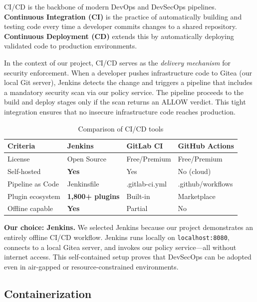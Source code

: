 CI/CD is the backbone of modern DevOps and DevSecOps pipelines. \textbf{Continuous Integration (CI)} is the practice of automatically building and testing code every time a developer commits changes to a shared repository. \textbf{Continuous Deployment (CD)} extends this by automatically deploying validated code to production environments.

In the context of our project, CI/CD serves as the \textit{delivery mechanism} for security enforcement. When a developer pushes infrastructure code to Gitea (our local Git server), Jenkins detects the change and triggers a pipeline that includes a mandatory security scan via our policy service. The pipeline proceeds to the build and deploy stages only if the scan returns an ALLOW verdict. This tight integration ensures that no insecure infrastructure code reaches production.

\begin{table}[H]
\centering
\caption{Comparison of CI/CD tools}
\label{tab:cicd-comparison}
\begin{tabular}{|p{2.5cm}|p{3cm}|p{3cm}|p{3cm}|}
\hline
\textbf{Criteria} & \textbf{Jenkins} & \textbf{GitLab CI} & \textbf{GitHub Actions} \\
\hline
License & Open Source & Free/Premium & Free/Premium \\
\hline
Self-hosted & \cellcolor{green!15}\textbf{Yes} & Yes & No (cloud) \\
\hline
Pipeline as Code & Jenkinsfile & .gitlab-ci.yml & .github/workflows \\
\hline
Plugin ecosystem & \cellcolor{green!15}\textbf{1,800+ plugins} & Built-in & Marketplace \\
\hline
Offline capable & \cellcolor{green!15}\textbf{Yes} & Partial & No \\
\hline
\end{tabular}
\end{table}

\noindent\textbf{Our choice: Jenkins.} We selected Jenkins because our project demonstrates an entirely offline CI/CD workflow. Jenkins runs locally on \texttt{localhost:8080}, connects to a local Gitea server, and invokes our policy service—all without internet access. This self-contained setup proves that DevSecOps can be adopted even in air-gapped or resource-constrained environments.

\subsection{Containerization}

